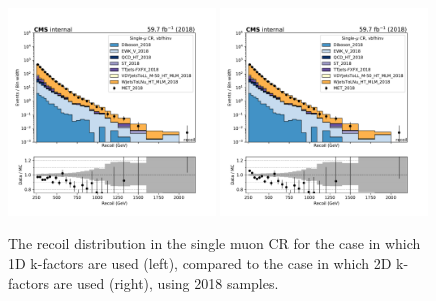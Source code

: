 \begin{figure}
    \begin{center}
        \includegraphics[width=0.49\textwidth]{fig/datamc/cr_1m_vbf/cr_1m_vbf_recoil_losf_2018.pdf}
        \includegraphics[width=0.49\textwidth]{fig/datamc_2dkfac/cr_1m_vbf/cr_1m_vbf_recoil_losf_2018.pdf} 
        \caption{The recoil distribution in the single muon CR for the case in which 1D k-factors are used (left), 
        compared to the case in which 2D k-factors are used (right), using 2018 samples.}
        \label{fig:recoil_2018}
    \end{center}
\end{figure}

